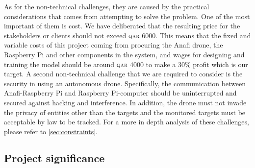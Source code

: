 \documentclass[../main.tex]{subfiles}
\begin{document}
As for the non-technical challenges, they are caused
by the practical considerations that comes 
from attempting to solve the problem.
One of the most important of them is cost. 
We have deliberated that
the resulting price for the stakeholders or clients
should not exceed \textsc{qar} 6000. 
This means that the fixed and variable costs of this project
coming from procuring the Anafi drone, the Raspberry Pi and other
components in the system, 
and wages for designing and training the model
should be around \textsc{qar} 4000 to make a 30\% profit 
which is our target.
A second non-technical challenge that we are required to consider
is the security in using an autonomous drone.
Specifically, the communication between Anafi-Raspberry Pi 
and Raspberry Pi-computer should be uninterrupted 
and secured against hacking and interference.
In addition, the drone must not invade the privacy 
of entities other than the targets
and the monitored targets 
must be acceptable by law to be tracked.
For a more in depth analysis of these challenges, 
please refer to \cref{sec:constraints}.



\blindtext

\subsection{Project significance}


\end{document}
